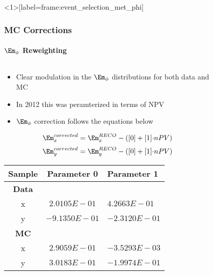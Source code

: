 \begin{frame}<1>[label=frame:event_selection_met_phi]
	\frametitle{MC Corrections}
	\framesubtitle{$\Em_{\phi}$ Reweighting}
	\vspace*{-0.54cm}
	\begin{columns}[T]
		\begin{column}{0.52\textwidth}
			\begin{block}{}
				\begin{itemize}
					\item Clear modulation in the $\Em_{\phi}$ distributions for both data and MC
					\item In 2012 this was peramterized in terms of NPV
					\item $\Em_{\phi}$ correction follows the equations below
				\end{itemize}
				\begin{equation}
				\Em_{x}^{corrected}=\Em_{x}^{RECO}-\left([0]+[1]{\cdot}nPV\right)\label{eq:METPhi_cor_x}
				\end{equation}
				\begin{equation}
				\Em_{y}^{corrected}=\Em_{y}^{RECO}-\left([0]+[1]{\cdot}nPV\right)\label{eq:METPhi_cor_y}
				\end{equation}
				\vspace*{-0.55cm}
				\begin{table}[hbtp]\footnotesize
					\centering
					\begin{tabular}{|c|c|l|}
					\hline\hline
					Sample & Parameter 0 & Parameter 1 \\
					\hline
					\textbf{Data} & & \\
					x & $2.0105E-01$ & $4.2663E-01$ \\
					\hline
					y & $-9.1350E-01$ & $-2.3120E-01$ \\
					\hline\hline
					\textbf{MC} & & \\
					x & $2.9059E-01$ & $-3.5293E-03$ \\
					\hline
					y & $3.0183E-01$ & $-1.9974E-01$ \\
					\hline\hline
					\end{tabular}
					\label{tab:METPhi_cor_xy}
				\end{table}
			\end{block}
		\end{column}
		\begin{column}{0.45\textwidth}
			\begin{figure}
				\centering

\end{figure}
\end{column}
\end{columns}
\end{frame}
